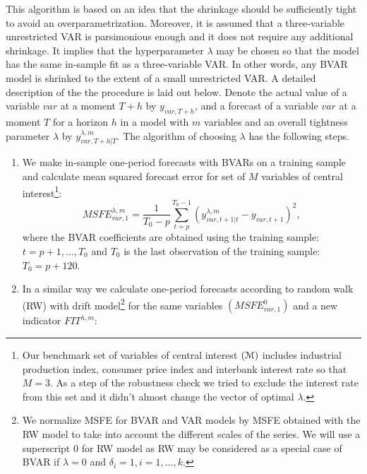 \documentclass[11pt]{article} %
\begin{document}
This algorithm is based on an idea that the shrinkage should be sufficiently tight  to avoid an overparametrization. Moreover, it is assumed that a three-variable unrestricted VAR is parsimonious enough and it does not require any additional shrinkage. It implies that the hyperparameter $\lambda$ may be chosen so that the model has the same in-sample fit as a three-variable VAR.  In other words, any BVAR model is shrinked to the extent of a small unrestricted VAR.  A detailed description of the the procedure is laid out below. Denote  the actual value of a variable $var$ at a moment $T+h$ by $y_{var,T+h}$, and  a forecast of a variable $var$ at a moment $T$ for a  horizon $h$ in a model with $m$ variables and an overall tightness parameter $\lambda$ by  $y_{var,T+h|T}^{\lambda,m}$. The algorithm of choosing $\lambda$ has the following steps. 
\begin{enumerate}
\item We make in-sample one-period forecasts with BVARs on a training sample and calculate mean squared forecast error for set  of $M$ variables of central interest\footnote{Our benchmark set of variables of central interest $(\EuScript{M})$ includes industrial production index, consumer price index and interbank interest rate so that $M=3$. As a step of the robustness check we tried to exclude the interest rate from this set and it didn't almost change the vector of optimal $\lambda$.}:
\begin{equation}
MSFE_{var,1}^{\lambda,m}=\frac{1}{T_0 - p}\sum_{t=p}^{T_0-1} \left(y_{var,t+1|t}^{\lambda,m}-y_{var,t+1}\right)^2,
\end{equation}
\noindent where  the BVAR coefficients are obtained using the training sample: $t=p+1,\ldots, T_0$ and $T_0$ is the last observation of the training sample: $T_0=p+120$. 
\item In a similar way we calculate one-period forecasts according to random walk (RW) with drift model\footnote{We normalize MSFE for BVAR and VAR models by MSFE obtained with the RW model to take into account the different scales of the series.
We will use a superscript 0 for RW model as RW may be considered as a special case of BVAR if $\lambda=0$ and $\delta_i=1, i=1,\ldots,k$.} for the same variables $\left(MSFE_{var,1}^0\right)$ and a new indicator $FIT^{\lambda,m}$:

\end{enumerate}
\end{document}

